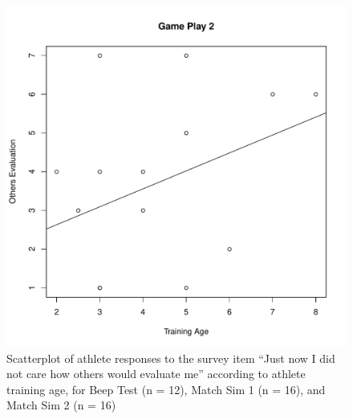 \begin{CJK}{UTF8}{gbsn}
\begin{figure}[htbp]
\includegraphics[scale=.2]{images/othersEval0116TrainingAge.pdf}
  \caption{Scatterplot of athlete responses to the survey item ``Just now I did not care how others would evaluate me'' according to athlete training age, for Beep Test (n = 12), Match Sim 1 (n = 16), and Match Sim 2 (n = 16)}
  \label{fig:othersEvalPostTraining}
\end{figure}



\end{CJK}
